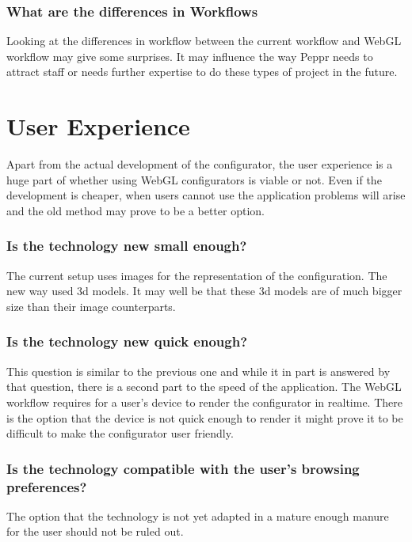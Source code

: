 \subsubsection {What are the differences in Workflows}
Looking at the differences in workflow between the current workflow and WebGL workflow may give some surprises. It may influence the way Peppr needs to attract staff or needs further expertise to do these types of project in the future.

\section{User Experience}
Apart from the actual development of the configurator, the user experience is a huge part of whether using WebGL configurators is viable or not. Even if the development is cheaper, when users cannot use the application problems will arise and the old method may prove to be a better option.
\subsubsection {Is the technology new small enough?}
The current setup uses images for the representation of the configuration. The new way used 3d models. It may well be that these 3d models are of much bigger size than their image counterparts.

\subsubsection {Is the technology new quick enough?}
This question is similar to the previous one and while it in part is answered by that question, there is a second part to the speed of the application. The WebGL workflow requires for a user's device to render the configurator in realtime. There is the option that the device is not quick enough to render it might prove it to be difficult to make the configurator user friendly.

\subsubsection {Is the technology compatible with the user's browsing preferences?}
The option that the technology is not yet adapted in a mature enough manure for the user should not be ruled out.